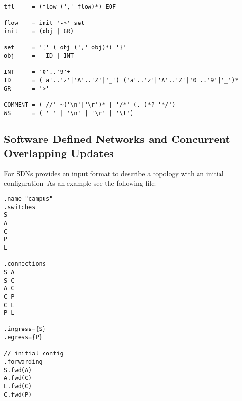 \documentclass[12pt,twoside,a4paper,openright]{memoir}
\begin{document}
\begin{lstlisting}[captionpos=b, caption=Grammar of the transit relation of Petri nets with transits., label = lst:grammar,language=ebnf]
tfl		= (flow (',' flow)*) EOF

flow  	= init '->' set
init  	= (obj | GR)

set		= '{' ( obj (',' obj)*) '}'
obj		=	ID | INT

INT 	= '0'..'9'+
ID  	= ('a'..'z'|'A'..'Z'|'_') ('a'..'z'|'A'..'Z'|'0'..'9'|'_')*
GR  	= '>'

COMMENT	= ('//' ~('\n'|'\r')* | '/*' (. )*? '*/')
WS		= ( ' ' | '\n' | '\r' | '\t')
\end{lstlisting}

\subsection{Software Defined Networks and Concurrent Overlapping Updates}
For SDNs \tool{} provides an input format to describe a topology with an
initial configuration. As an example see the following file:
\begin{lstlisting}[captionpos=b, caption=Example for a topology and inital configuration of an SDN., label = lst:grammar,language=sdn-format]
.name "campus"
.switches
S
A
C
P
L
 
.connections
S A
S C
A C
C P
C L
P L

.ingress={S}
.egress={P}

// initial config
.forwarding
S.fwd(A)
A.fwd(C)
L.fwd(C)
C.fwd(P)
\end{lstlisting}
\end{document}
